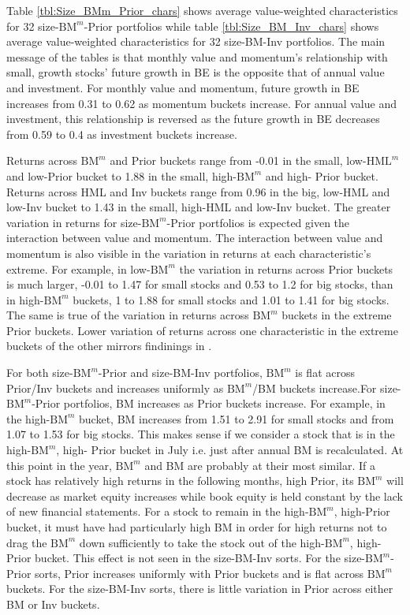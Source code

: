
Table \ref{tbl:Size_BMm_Prior_chars} shows average value-weighted
characteristics for 32 size-$\text{BM}^m$-Prior portfolios while table
\ref{tbl:Size_BM_Inv_chars} shows average value-weighted characteristics for 32
size-BM-Inv portfolios. The main message of the tables is that monthly value
and momentum's relationship with small, growth stocks' future growth in BE is
the opposite that of annual value and investment. For monthly value and
momentum, future growth in BE increases from 0.31 to 0.62 as momentum buckets
increase. For annual value and investment, this relationship is reversed as the
future growth in BE decreases from 0.59 to 0.4 as investment buckets increase.

Returns across $\text{BM}^m$ and Prior buckets range from -0.01 in the small,
low-$\text{HML}^m$ and low-Prior bucket to 1.88 in the small,
high-$\text{BM}^m$ and high- Prior bucket. Returns across HML and Inv buckets
range from 0.96 in the big, low-HML and low-Inv bucket to 1.43 in the small,
high-HML and low-Inv bucket. The greater variation in returns for
size-$\text{BM}^m$-Prior portfolios is expected given the interaction between
value and momentum. The interaction between value and momentum is also visible
in the variation in returns at each characteristic's extreme. For example, in
low-$\text{BM}^m$ the variation in returns across Prior buckets is much larger,
-0.01 to 1.47 for small stocks and 0.53 to 1.2 for big stocks, than in
high-$\text{BM}^m$ buckets, 1 to 1.88 for small stocks and 1.01 to 1.41 for big
stocks. The same is true of the variation in returns across $\text{BM}^m$
buckets in the extreme Prior buckets. Lower variation of returns across one
characteristic in the extreme buckets of the other mirrors findinings in
\textcite{asness2013devil}.

For both size-$\text{BM}^m$-Prior and size-BM-Inv portfolios, $\text{BM}^m$ is
flat across Prior/Inv buckets and increases uniformly as $\text{BM}^m$/BM
buckets increase.For size-$\text{BM}^m$-Prior portfolios, BM increases as Prior
buckets increase. For example, in the high-$\text{BM}^m$ bucket, BM increases
from 1.51 to 2.91 for small stocks and from 1.07 to 1.53 for big stocks. This
makes sense if we consider a stock that is in the high-$\text{BM}^m$, high-
Prior bucket in July i.e. just after annual BM is recalculated. At this point
in the year, $\text{BM}^m$ and BM are probably at their most similar. If a
stock has relatively high returns in the following months, high Prior, its
$\text{BM}^m$ will decrease as market equity increases while book equity is
held constant by the lack of new financial statements. For a stock to remain in
the high-$\text{BM}^m$, high-Prior bucket, it must have had particularly high
BM in order for high returns not to drag the $\text{BM}^m$ down sufficiently to
take the stock out of the high-$\text{BM}^m$, high- Prior bucket. This effect
is not seen in the size-BM-Inv sorts. For the size-$\text{BM}^m$-Prior sorts,
Prior increases uniformly with Prior buckets and is flat across $\text{BM}^m$
buckets. For the size-BM-Inv sorts, there is little variation in Prior across
either BM or Inv buckets.

